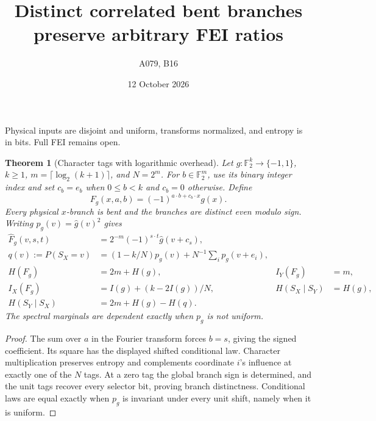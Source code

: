 \documentclass[11pt]{article}
\newtheorem{theorem}{Theorem}
\newcommand{\F}{\mathbb F}
\newcommand{\wh}{\widehat}
\begin{document}
\title{Distinct correlated bent branches preserve arbitrary FEI ratios}
\author{A079, B16}\date{12 October 2026}\maketitle
Physical inputs are disjoint and uniform, transforms normalized, and entropy is in bits. Full FEI remains open.

\begin{theorem}[Character tags with logarithmic overhead]
Let $g:\F_2^k\to\{-1,1\}$, $k\ge1$, $m=\lceil\log_2(k+1)\rceil$, and $N=2^m$. For $b\in\F_2^m$, use its binary integer index and set $c_b=e_b$ when $0\le b<k$ and $c_b=0$ otherwise. Define
\[
 F_g(x,a,b)=(-1)^{a\cdot b+c_b\cdot x}g(x).
\]
Every physical $x$-branch is bent and the branches are distinct even modulo sign. Writing $p_g(v)=\wh g(v)^2$ gives
\begin{align*}
 \wh F_g(v,s,t)&=2^{-m}(-1)^{s\cdot t}\wh g(v+c_s),\\
 q(v):=P(S_X=v)&=(1-k/N)p_g(v)+N^{-1}\sum_i p_g(v+e_i),\\
 H(F_g)&=2m+H(g),& I_Y(F_g)&=m,\\
 I_X(F_g)&=I(g)+(k-2I(g))/N,& H(S_X\mid S_Y)&=H(g),\\
 H(S_Y\mid S_X)&=2m+H(g)-H(q).
\end{align*}
The spectral marginals are dependent exactly when $p_g$ is not uniform.
\end{theorem}
\begin{proof}
The sum over $a$ in the Fourier transform forces $b=s$, giving the signed coefficient. Its square has the displayed shifted conditional law. Character multiplication preserves entropy and complements coordinate $i$'s influence at exactly one of the $N$ tags. At a zero tag the global branch sign is determined, and the unit tags recover every selector bit, proving branch distinctness. Conditional laws are equal exactly when $p_g$ is invariant under every unit shift, namely when it is uniform.
\end{proof}
\end{document}
